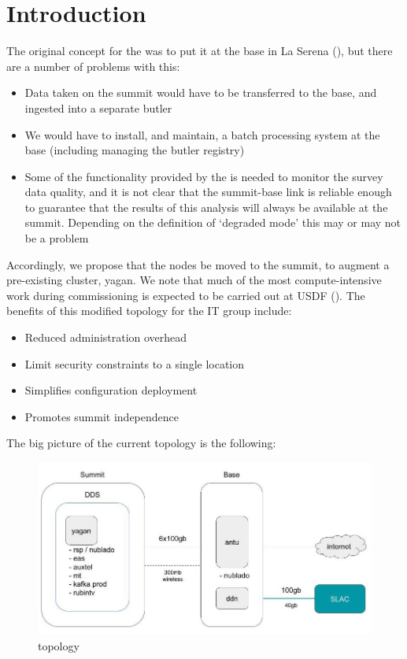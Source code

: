 \section{Introduction}


The original concept for the \CC was to put it at the base in La Serena (\cite[Sec. 9]{LDM-148}),
but there are a number of problems with this:
\begin{itemize}
\item
  Data taken on the summit would have to be transferred to the base, and ingested into a separate butler
\item
  We would have to install, and maintain, a batch processing system at the base (including managing
  the butler registry)
\item
  Some of the functionality provided by the \CC is needed to monitor the survey data quality,
  and it is not clear that the summit-base link is reliable enough to guarantee that the results of this
  analysis will always be available at the summit.  Depending on the definition of `degraded mode' this
  may or may not be a problem
\end{itemize}

Accordingly, we propose that the \CC nodes be moved to the summit, to augment a pre-existing cluster, yagan.
We note that much of the most compute-intensive work during commissioning is expected to be carried out at
USDF (\cite{RTN-021}).
The benefits of this modified topology for the IT group include:
\begin{itemize}
    \item Reduced administration overhead 
    \item Limit security constraints to a single location
    \item Simplifies configuration deployment
    \item Promotes summit independence 
\end{itemize}
The big picture of the current topology is the following:

\begin{figure}
    \centering
    \includegraphics[width=18cm]{images/current_state.jpg}
    \caption{topology}
\end{figure}

\newpage
